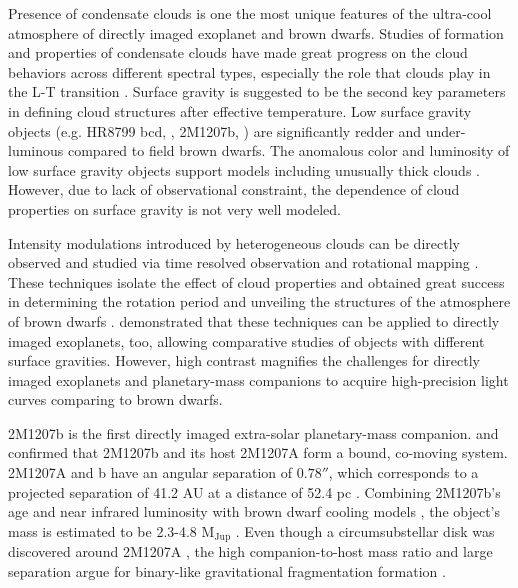 \documentclass[apj]{emulateapj}
\newcommand{\revise}[1]{\textit{\textbf{{\color{red}{#1}}}}}
\begin{document}
Presence of condensate clouds is one the most unique features of the
ultra-cool atmosphere of directly imaged exoplanet and brown
dwarfs. Studies of formation and properties of condensate clouds
\citep[e.g.][]{Ackerman2001, Burrows2006a, Helling2008, Allard2012}
have made great progress on the cloud behaviors across different
spectral types, especially the role that clouds play in the L-T
transition \citep[e.g.][]{Burrows2006a, Marley2010}.  Surface gravity
is suggested to be the second key parameters in defining cloud
structures \citep[e.g.][]{Marley2012} after effective temperature. Low
surface gravity objects (e.g. HR8799 bcd, \cite{Marois2008a}, 2M1207b, \cite{Chauvin2004}) are significantly redder and under-luminous
compared to field brown dwarfs.  The anomalous color and luminosity of
low surface gravity objects support models including unusually thick
clouds \citep{Currie2011, Madhusudhan2011,Skemer2011,
  Skemer2012}. However, due to lack of observational constraint, the
dependence of cloud properties on surface gravity is not very well
modeled.

Intensity modulations introduced by heterogeneous clouds can be
directly observed and studied via time resolved observation and
rotational mapping
\citep[e.g.][]{Apai2013,Buenzli2012,Buenzli2015,Burgasser2013,Radigan2012,Yang2015,Metchev2015,Heinze2015,
Biller2015}. These techniques isolate the effect of cloud
properties and obtained great success in determining the rotation
period and unveiling the structures of the atmosphere of brown dwarfs
. \citet{Kostov2013}
demonstrated that these techniques can be applied to directly imaged
exoplanets, too, allowing comparative studies of objects with
different surface gravities. However, high contrast magnifies the
challenges for directly imaged exoplanets and planetary-mass
companions to acquire high-precision light curves comparing to
\revise{isolated} brown
dwarfs.


2M1207b \citet{Chauvin2004} is the first directly imaged extra-solar
planetary-mass companion. \citet{Chauvin2005} and \citet{Song2006}
confirmed that 2M1207b and its host 2M1207A form a bound, co-moving
system. 2M1207A and b have an angular separation of $0.78''$, which
corresponds to a projected separation of 41.2 AU at a distance of 52.4
pc \citep[e.g.][]{Ducourant2008}. Combining 2M1207b's age and near
infrared luminosity with brown dwarf cooling models
\citep[e.g.][]{Baraffe2003}, the object's mass is estimated to be
2.3-4.8 M$_{\mathrm{Jup}}$ \citep{Barman2011b}. Even though a
circumsubstellar disk was discovered around 2M1207A
\citep[][]{Sterzik2004}, the high companion-to-host mass ratio and
large separation argue for binary-like gravitational fragmentation
formation \revise{\citep{Lodato2005,Mohanty2007}}.
\end{document}
